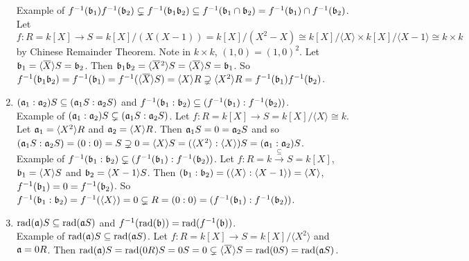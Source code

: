 \begin{proposition}
\begin{enumerate}
            Example of $f^{-1}(\mathfrak{b}_1)f^{-1}(\mathfrak{b}_2) \subsetneq f^{-1}(\mathfrak{b}_1\mathfrak{b}_2) \subseteq f^{-1}(\mathfrak{b}_1 \cap \mathfrak{b}_2) = f^{-1}(\mathfrak{b}_1) \cap f^{-1}(\mathfrak{b}_2)$. Let $f: R = k[X] \to S = k[X]/(X(X-1)) = k[X]/(X^2-X) \cong k[X]/\langle X \rangle \times k[X]/\langle X-1 \rangle \cong k \times k$ by Chinese Remainder Theorem. Note in $k \times k$, $(1,0) = (1,0)^2$. Let $\ffb_1 = \langle \overbar X \rangle S = \ffb_2$. Then $\ffb_1 \ffb_2 = \langle \overbar X^2 \rangle S = \langle \overbar X \rangle S = \ffb_1$. So $f^{-1}(\ffb_1 \ffb_2) = f^{-1}(\ffb_1)  =  f^{-1}(\langle \overbar X \rangle S) = \langle X \rangle R \supsetneq \langle X^2 \rangle R = f^{-1}(\ffb_1)f^{-1}(\ffb_2)$.
        \item $(\mathfrak{a}_1:\mathfrak{a}_2)S \subseteq (\mathfrak{a}_1S:\mathfrak{a}_2S)$ and $f^{-1}(\mathfrak{b}_1:\mathfrak{b}_2) \subseteq (f^{-1}(\mathfrak{b}_1):f^{-1}(\mathfrak{b}_2))$. \\
            Example of $(\mathfrak{a}_1:\mathfrak{a}_2)S \subsetneq (\mathfrak{a}_1S : \mathfrak{a}_2 S)$. Let $f: R = k[X] \to S = k[X]/\langle X \rangle \cong k$. Let $\mathfrak{a}_1 = \langle X^2 \rangle R$ and $\mathfrak{a}_2 = \langle X \rangle R$. Then $\mathfrak{a}_1 S = 0 = \mathfrak{a}_2 S$ and so $(\mathfrak{a}_1 S: \mathfrak{a}_2 S) = (0:0) = S \supsetneq 0 = \langle X \rangle S = (\langle X^2 \rangle: \langle X \rangle)S = (\mathfrak{a}_1:\mathfrak{a}_2)S$. \\
            Example of $f^{-1}(\mathfrak{b}_1:\mathfrak{b}_2) \subsetneq (f^{-1}(\mathfrak{b}_1):f^{-1}(\mathfrak{b}_2))$. Let $f: R = k \xrightarrow {\subseteq} S = k[X]$, $\mathfrak{b}_1 = \langle X \rangle S$ and $\mathfrak{b}_2 = \langle X-1 \rangle S$. Then $(\mathfrak{b}_1:\mathfrak{b}_2) = (\langle X \rangle: \langle X-1 \rangle) = \langle X \rangle$, $f^{-1}(\mathfrak{b}_1) = 0 = f^{-1}(\mathfrak{b}_2)$. So $f^{-1}(\mathfrak{b}_1:\mathfrak{b}_2) = f^{-1}(\langle X \rangle) = 0 \subsetneq R = (0:0) = (f^{-1}(\mathfrak{b}_1):f^{-1}(\mathfrak{b}_2))$. 
        \item $\operatorname{rad}(\mathfrak{a})S \subseteq \operatorname{rad}(\mathfrak{a} S)$ and $f^{-1}(\operatorname{rad}(\mathfrak{b})) = \operatorname{rad}(f^{-1}(\mathfrak{b}))$. \\
            Example of $\operatorname{rad}(\mathfrak{a}) S \subseteq \operatorname{rad}(\mathfrak{a} S)$. Let $f: R = k[X] \to S = k[X]/\langle X^2 \rangle$ and $\mathfrak{a} = 0R$. Then $\operatorname{rad}(\ffa)S = \operatorname{rad}(0R)S = 0S = 0 \subsetneq \langle \overbar X \rangle S = \operatorname{rad}(0S) = \operatorname{rad}(\ffa S)$.
    \end{enumerate}
\end{proposition}

